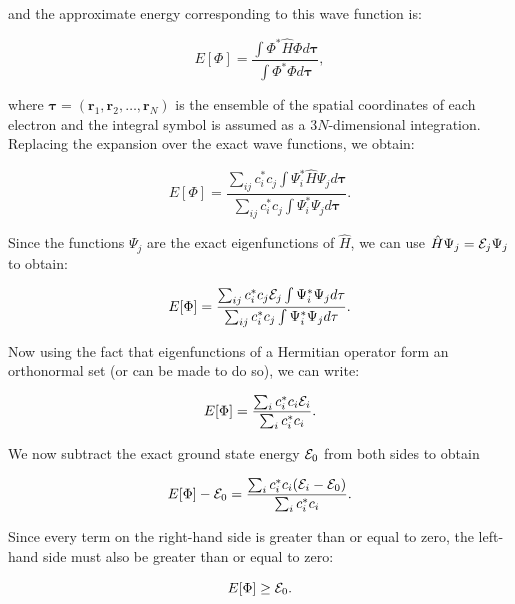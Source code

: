 \documentclass[
  9pt,
]{extbook}
\theoremstyle{definition}
\theoremstyle{definition}
\theoremstyle{definition}
\theoremstyle{remark}
\begin{document}
and the approximate energy corresponding to this wave function is:

\begin{equation}
E[\Phi] = \frac{\int \Phi^* {\hat H} \Phi d\mathbf{\tau}}{\int \Phi^* \Phi d\mathbf{\tau}},
\label{eq:var2}
\end{equation}

where \(\mathbf{\tau}=\left(\mathbf{r}_1,\mathbf{r}_2,\ldots,\mathbf{r}_N\right)\) is the ensemble of the spatial coordinates of each electron and the integral symbol is assumed as a \(3N\)-dimensional integration. Replacing the expansion over the exact wave functions, we obtain:

\begin{equation}
E[\Phi] = \frac{\sum_{ij} c_i^* c_j \int \Psi_i^* {\hat H} \Psi_jd\mathbf{\tau}}{
\sum_{ij} c_i^* c_j \int \Psi_i^* \Psi_jd\mathbf{\tau}}.
\label{eq:var3}
\end{equation}

Since the functions \(\Psi_j\) are the exact eigenfunctions of \({\hat H}\), we can use \({\hat H} \Psi_j = {\cal E}_j \Psi_j\) to obtain:

\begin{equation}
E[\Phi] = \frac{\sum_{ij} c_i^* c_j {\cal E}_j \int \Psi_i^* \Psi_j d\mathbf{\tau}}{
\sum_{ij} c_i^* c_j \int \Psi_i^* \Psi_j d\mathbf{\tau}}.
\label{eq:var4}
\end{equation}

Now using the fact that eigenfunctions of a Hermitian operator form an orthonormal set (or can be made to do so), we can write:

\begin{equation}
E[\Phi] = \frac{\sum_{i} c_i^* c_i {\cal E}_i}{\sum_{i} c_i^* c_i}.
\label{eq:var5}
\end{equation}

We now subtract the exact ground state energy \({\cal E}_0\) from both sides to obtain

\begin{equation}
E[\Phi] - {\cal E}_0 = \frac{\sum_i c_i^* c_i ( {\cal E}_i - {\cal E}_0)}{
\sum_i c_i^* c_i}.
\label{eq:var6}
\end{equation}

Since every term on the right-hand side is greater than or equal to zero, the left-hand side must also be greater than or equal to zero:

\begin{equation}
E[\Phi] \geq {\cal E}_0.
\label{eq:varprinciple}
\end{equation}
\end{document}
